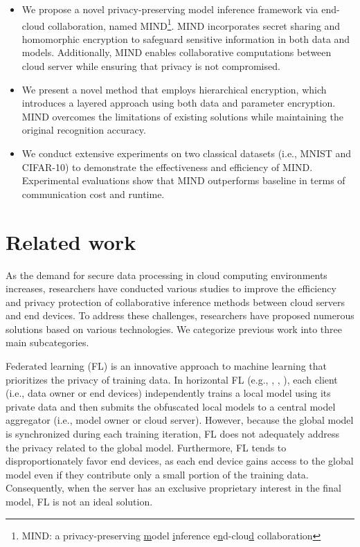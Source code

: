 \documentclass[conference]{IEEEtran}
\begin{document}
\begin{itemize}
    \item We propose a novel privacy-preserving model inference framework via end-cloud collaboration, named MIND\footnote{MIND: a privacy-preserving \underline{m}odel \underline{i}nference e\underline{n}d-clou\underline{d} collaboration}. MIND incorporates secret sharing and homomorphic encryption to safeguard sensitive information in both data and models. Additionally, MIND enables collaborative computations between cloud server while ensuring that privacy is not compromised.
    
    \item We present a novel method that employs hierarchical encryption, which introduces a layered approach using both data and parameter encryption. MIND overcomes the limitations of existing solutions while maintaining the original recognition accuracy.
    
    \item We conduct extensive experiments on two classical datasets (i.e., MNIST and CIFAR-10) to demonstrate the effectiveness and efficiency of MIND. Experimental evaluations show that MIND outperforms baseline in terms of communication cost and runtime.  
\end{itemize}
\section{Related work}
As the demand for secure data processing in cloud computing environments increases, researchers have conducted various studies to improve the efficiency and privacy protection of collaborative inference methods between cloud servers and end devices. To address these challenges, researchers have proposed numerous solutions based on various technologies. We categorize previous work into three main subcategories.

Federated learning (FL) is an innovative approach to machine learning that prioritizes the privacy of training data. In horizontal FL (e.g., \cite{pmlr-v54-mcmahan17a}, \cite{Gupta2018DistributedLO}, \cite{9252066}), each client (i.e., data owner or end devices) independently trains a local model using its private data and then submits the obfuscated local models to a central model aggregator (i.e., model owner or cloud server). However, because the global model is synchronized during each training iteration, FL does not adequately address the privacy related to the global model. Furthermore, FL tends to disproportionately favor end devices, as each end device gains access to the global model even if they contribute only a small portion of the training data. Consequently, when the server has an exclusive proprietary interest in the final model, FL is not an ideal solution.
\end{document}
